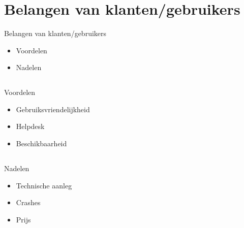 \documentclass{beamer}
\begin{document}

\section[Klant]{Belangen van klanten/gebruikers}
\begin{frame}{Belangen van klanten/gebruikers}
    \begin{itemize}
        \item Voordelen 
        \item Nadelen
    \end{itemize} 
\end{frame}
    \subsection{}
    \begin{frame}{Voordelen}
        \begin{itemize}
            \item Gebruiksvriendelijkheid
            \item Helpdesk
            \item Beschikbaarheid
        \end{itemize}
    \end{frame}
            
    \subsection{}
    \begin{frame}{Nadelen}
        \begin{itemize}
            \item Technische aanleg
            \item Crashes
            \item Prijs
        \end{itemize}
    \end{frame}
    
\end{document}
